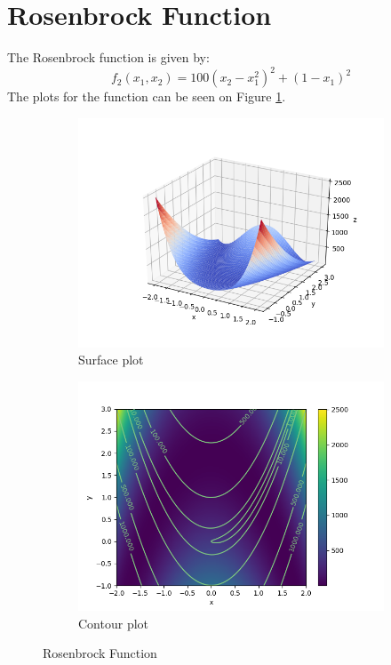 \documentclass[a4paper]{article}
\begin{document}
\section{Rosenbrock Function}
\label{sec:rosenbrock}
The Rosenbrock function is given by:
\[
f_2(x_1,x_2) = 100(x_2 - x_1^2)^2 + (1 - x_1)^2
\]
The plots for the function can be seen on Figure \ref{plt2}.
\begin{figure}[H]
  \centering
  \begin{subfigure}[b]{0.49\textwidth}
    \centering
    \includegraphics[width=\textwidth]{imgs/plt21}
    \caption{Surface plot}
  \end{subfigure}
  \begin{subfigure}[b]{0.49\textwidth}
    \centering
    \includegraphics[width=\textwidth]{imgs/plt22}
    \caption{Contour plot}
  \end{subfigure}
  \caption{Rosenbrock Function}
  \label{plt2}
\end{figure}
\end{document}
